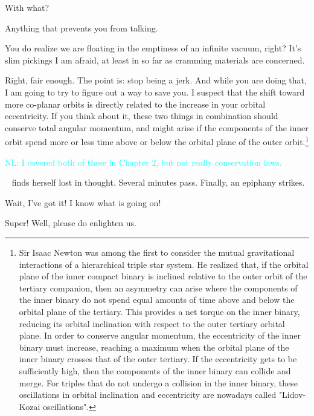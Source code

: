 \documentclass[main.tex]{subfiles}
\begin{document}
\par \Alcyone With what?

\par \Celaeno Anything that prevents you from talking.  

\par \Alcyone You do realize we are floating in the emptiness of an infinite vacuum, right?  It's slim pickings I am afraid, at least in so far as cramming materials are concerned.

\par \Celaeno Right, fair enough.  The point is:  stop being a jerk.  And while you are doing that, I am going to try to figure out a way to save you.  I suspect that the shift toward more co-planar orbits is directly related to the increase in your orbital eccentricity.  If you think about it, these two things in combination should conserve total angular momentum, and might arise if the components of the inner orbit spend more or less time above or below the orbital plane of the outer orbit.\footnote{Sir Isaac Newton was among the first to consider the mutual gravitational interactions of a hierarchical triple star system.  He realized that, if the orbital plane of the inner compact binary is inclined relative to the outer orbit of the tertiary companion, then an asymmetry can arise where the components of the inner binary do not spend equal amounts of time above and below the orbital plane of the tertiary.  This provides a net torque on the inner binary, reducing its orbital inclination with respect to the outer tertiary orbital plane.  In order to conserve angular momentum, the eccentricity of the inner binary must increase, reaching a maximum when the orbital plane of the inner binary crosses that of the outer tertiary.  If the eccentricity gets to be sufficiently high, then the components of the inner binary can collide and merge.  For triples that do not undergo a collision in the inner binary, these oscillations in orbital inclination and eccentricity are nowadays called "Lidov-Kozai oscillations".} 

\textcolor{cyan}{NL:  I covered both of these in Chapter 2, but not really conservation laws.}

\par \nar \rmcelaeno~ finds herself lost in thought.  Several minutes pass.  Finally, an epiphany strikes.

\par \Celaeno  Wait, I've got it!  I know what is going on!

\par \Taygete  Super!  Well, please do enlighten us.
\end{document}
